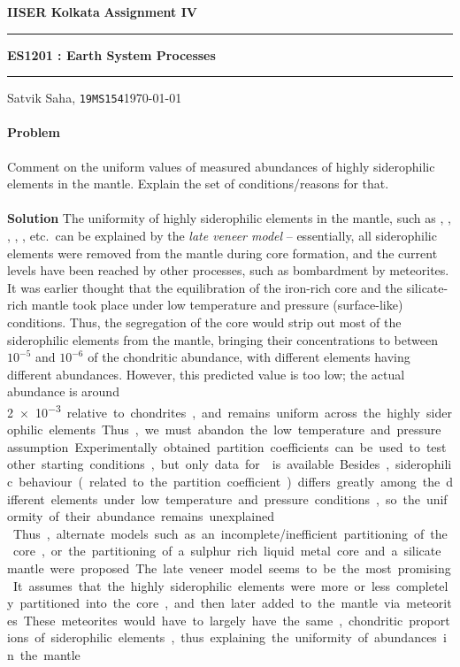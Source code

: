 \documentclass[10pt]{article}
\newcounter{prob}
\def\problem{\stepcounter{prob}\paragraph{Problem \arabic{prob}}}
\def\solution{\\\\\textbf{Solution }}
\begin{document}
        \par\textbf{IISER Kolkata} \hfill \textbf{Assignment IV}
        \vspace{3pt}
        \hrule
        \vspace{3pt}
        \begin{center}
                \LARGE{\textbf{ES1201 : Earth System Processes}}
        \end{center}
        \vspace{3pt}
        \hrule
        \vspace{3pt}
        Satvik Saha, \texttt{19MS154}\hfill\today
        \vspace{20pt}
        
        \problem Comment on the uniform values of measured abundances of highly siderophilic elements in the mantle. 
        Explain the set of conditions/reasons for that.
        \solution The uniformity of highly siderophilic elements in the mantle, such as , , , , , etc.\ 
        can be explained by the \textit{late veneer model} -- essentially, all siderophilic elements were removed from the mantle
        during core formation, and the current levels have been reached by other processes, such as bombardment by meteorites. \\

        It was earlier thought that the equilibration of the iron-rich core and the silicate-rich mantle took place under low temperature and pressure
        (surface-like) conditions. Thus, the segregation of the core would strip out most of the siderophilic elements from the mantle, bringing
        their concentrations to between $10^{-5}$ and $10^{-6}$ of the chondritic abundance, with different elements having different abundances.
        However, this predicted value is too low; the actual abundance is around \SI{2e-3} relative to chondrites, and remains uniform across the highly
        siderophilic elements. Thus, we must abandon the low temperature and pressure assumption. Experimentally obtained partition coefficients
        can be used to test other starting conditions, but only data for \ch{Re} is available. Besides, siderophilic behaviour (related to the 
        partition coefficient) differs greatly among the different elements under low temperature and pressure conditions, so the uniformity of their
        abundance remains unexplained.\\

        Thus, alternate models such as an incomplete/inefficient partitioning of the core, or the partitioning of a sulphur rich liquid metal core
        and a silicate mantle were proposed. The late veneer model seems to be the most promising. It assumes that the highly siderophilic elements
        were more or less completely partitioned into the core, and then later added to the mantle via meteorites.
        These meteorites would have to largely have the same, chondritic proportions of siderophilic elements, thus explaining the
        uniformity of abundances in the mantle. \\
\end{document}
